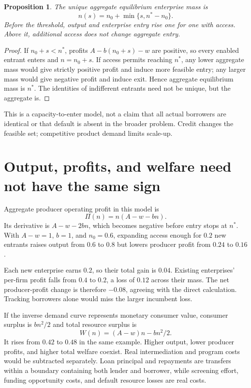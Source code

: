 \documentclass[11pt,a4paper]{article}
\newtheorem{proposition}[theorem]{Proposition}
\begin{document}
\begin{proposition}
The unique aggregate equilibrium enterprise mass is
\[
 n(s)=n_0+\min\{s,n^*-n_0\}.
 \tag{1}
\]
Before the threshold, output and enterprise entry rise one for one with access. Above it, additional access does not change aggregate entry.
\end{proposition}
\begin{proof}
If $n_0+s<n^*$, profits $A-b(n_0+s)-w$ are positive, so every enabled entrant enters and $n=n_0+s$. If access permits reaching $n^*$, any lower aggregate mass would give strictly positive profit and induce more feasible entry; any larger mass would give negative profit and induce exit. Hence aggregate equilibrium mass is $n^*$. The identities of indifferent entrants need not be unique, but the aggregate is.
\end{proof}
This is a capacity-to-enter model, not a claim that all actual borrowers are identical or that default is absent in the broader problem. Credit changes the feasible set; competitive product demand limits scale-up.
\section{Output, profits, and welfare need not have the same sign}
Aggregate producer operating profit in this model is
\[
 \Pi(n)=n(A-w-bn).
\]
Its derivative is $A-w-2bn$, which becomes negative before entry stops at $n^*$. With $A-w=1$, $b=1$, and $n_0=0.6$, expanding access enough for $0.2$ new entrants raises output from $0.6$ to $0.8$ but lowers producer profit from $0.24$ to $0.16$.

Each new enterprise earns $0.2$, so their total gain is $0.04$. Existing enterprises' per-firm profit falls from $0.4$ to $0.2$, a loss of $0.12$ across their mass. The net producer-profit change is therefore $-0.08$, agreeing with the direct calculation. Tracking borrowers alone would miss the larger incumbent loss.

If the inverse demand curve represents monetary consumer value, consumer surplus is $bn^2/2$ and total resource surplus is
\[
 W(n)=(A-w)n-bn^2/2.
\]
It rises from $0.42$ to $0.48$ in the same example. Higher output, lower producer profits, and higher total welfare coexist. Real intermediation and program costs would be subtracted separately. Loan principal and repayments are transfers within a boundary containing both lender and borrower, while screening effort, funding opportunity costs, and default resource losses are real costs.
\end{document}
